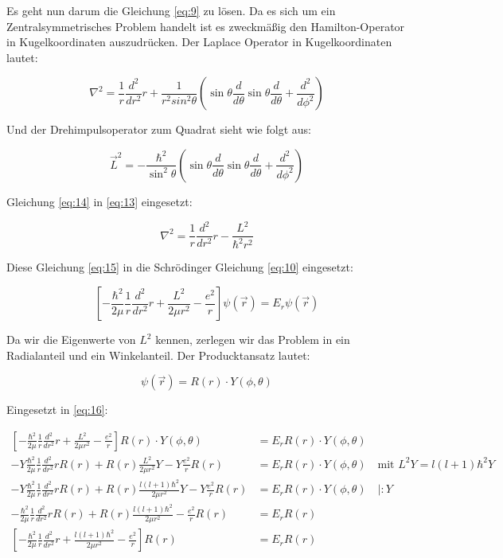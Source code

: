 Es geht nun darum die Gleichung \eqref{eq:9} zu lösen. Da es sich um ein Zentralsymmetrisches Problem handelt ist es zweckmäßig den Hamilton-Operator in Kugelkoordinaten auszudrücken. Der Laplace Operator in Kugelkoordinaten lautet:

\begin{equation}
  \label{eq:13}
  \nabla^2 = \frac{1}{r}\frac{d^2}{dr^2}r + \frac{1}{r^2sin^2\theta}\left( \sin\theta \frac{d}{d\theta}\sin\theta\frac{d}{d\theta}+\frac{d^2}{d\phi^2}\right) 
\end{equation}

Und der Drehimpulsoperator zum Quadrat sieht wie folgt aus:

\begin{equation}
  \label{eq:14}
  \vec L^2 = -\frac{\hbar^2}{\sin^2\theta}\left( \sin\theta \frac{d}{d\theta}\sin\theta\frac{d}{d\theta}+\frac{d^2}{d\phi^2}\right) 
\end{equation}

Gleichung \eqref{eq:14} in  \eqref{eq:13} eingesetzt:

\begin{equation}
  \label{eq:15}
   \nabla^2 = \frac{1}{r}\frac{d^2}{dr^2}r - \frac{L^2}{\hbar^2r^2}
\end{equation}

Diese Gleichung \eqref{eq:15} in die Schrödinger Gleichung \eqref{eq:10} eingesetzt: 

\begin{equation}
  \label{eq:16}
  \left[-\frac{\hbar^2}{2\mu}\frac{1}{r}\frac{d^2}{dr^2}r + \frac{L^2}{2\mu r^2}  - \frac{e^2}{r} \right]\psi(\vec r) = E_r\psi(\vec r) 
\end{equation}

Da wir die Eigenwerte von \(L^2\) kennen, zerlegen wir das Problem in ein Radialanteil und ein Winkelanteil. Der Producktansatz lautet:

\begin{equation}
  \label{eq:17}
  \psi(\vec r) = R(r)\cdot Y(\phi,\theta) 
\end{equation}

Eingesetzt in \eqref{eq:16}:

\begin{align}
  \left[-\frac{\hbar^2}{2\mu}\frac{1}{r}\frac{d^2}{dr^2}r + \frac{L^2}{2\mu r^2}  - \frac{e^2}{r} \right]R(r)\cdot Y(\phi,\theta)  &= E_rR(r)\cdot Y(\phi,\theta) \\
  - Y\frac{\hbar^2}{2\mu}\frac{1}{r}\frac{d^2}{dr^2}r R(r) + R(r)\frac{L^2}{2\mu r^2} Y  -Y \frac{e^2}{r} R(r)   &= E_rR(r)\cdot Y(\phi,\theta) \quad \text{mit } L^2Y = l(l+1)\hbar^2 Y\\
  - Y\frac{\hbar^2}{2\mu}\frac{1}{r}\frac{d^2}{dr^2}r R(r) + R(r)\frac{l(l+1)\hbar^2}{2\mu r^2}Y  -Y \frac{e^2}{r} R(r)   &= E_rR(r)\cdot Y(\phi,\theta) \quad |:Y\\
  - \frac{\hbar^2}{2\mu}\frac{1}{r}\frac{d^2}{dr^2}r R(r) + R(r)\frac{l(l+1)\hbar^2}{2\mu r^2}  - \frac{e^2}{r} R(r)   &= E_rR(r)\\
  \left[- \frac{\hbar^2}{2\mu}\frac{1}{r}\frac{d^2}{dr^2}r + \frac{l(l+1)\hbar^2}{2\mu r^2}  - \frac{e^2}{r}\right] R(r)   &= E_rR(r)  \label{eq:18}
\end{align}

